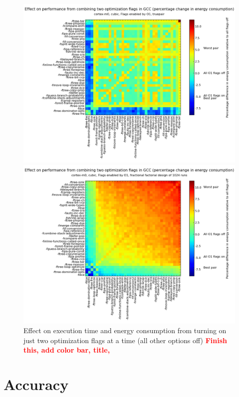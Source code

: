 \documentclass[twocolumn]{article}
\newcommand{\nsection}[1]{\section{\bfseries #1}}
\newcommand{\todo}[1]{\textbf{\textcolor{red}{#1}}}
\let\oldcaption\caption
\renewcommand{\caption}[1]{\oldcaption{\textup{#1}}}
\begin{document}
\begin{figure}
    \begin{minipage}[l]{1.0\columnwidth}
        \centering
		\includegraphics[width=0.8\linewidth, clip, trim= 8.8cm 0 7cm 0]{cortex-m0/o1cub_-7p5_10.png}
    \end{minipage}
    \hfill{}
    \begin{minipage}[r]{1.0\columnwidth}
        \centering
		\includegraphics[width=0.8\linewidth, clip, trim= 8.8cm 0 7cm 0]{cortex-m0/o1cub_-7p5_10_pred.png}
    \end{minipage}
    \caption{Effect on execution time and energy consumption from turning on just two optimization flags at a time (all other options off) \todo{Finish this, add color bar, title, }}
\end{figure}




\nsection{Accuracy}
\end{document}
